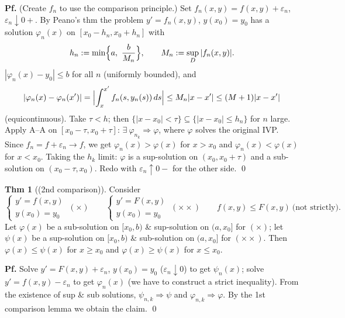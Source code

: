 \documentclass[11pt]{article}
\theoremstyle{definition}
\newtheorem*{theorem}{Thm}
\theoremstyle{remark}
\begin{document}
\textbf{Pf.} (Create $f_n$ to use the comparison principle.) Set
$f_n(x,y) = f(x,y) + \varepsilon_n$, $\varepsilon_n \downarrow 0+$. By Peano's thm the problem
$y' = f_n(x,y)$, $y(x_0) = y_0$ has a solution $\varphi_n(x)$ on $[x_0 - h_n, x_0 + h_n]$ with
\[
h_n := \min\Bigl\{a,\ \frac{b}{M_n}\Bigr\}, \qquad M_n := \sup_D |f_n(x,y)|.
\]
$|\varphi_n(x) - y_0| \le b$ for all $n$ (uniformly bounded), and
\[
|\varphi_n(x) - \varphi_n(x')| = \Bigl|\int_x^{x'} f_n(s, y_n(s))\, ds\Bigr| \le M_n|x - x'| \le (M+1)|x - x'|
\]
(equicontinuous). Take $\tau < h$; then $\{|x - x_0| < \tau\} \subseteq \{|x - x_0| \le h_n\}$ for
$n$ large. Apply A--A on $[x_0 - \tau, x_0 + \tau]$: $\exists\ \varphi_{n_k} \Rightarrow \varphi$,
where $\varphi$ solves the original IVP. Since $f_n = f + \varepsilon_n \to f$, we get
$\varphi_n(x) > \varphi(x)$ for $x > x_0$ and $\varphi_n(x) < \varphi(x)$ for $x < x_0$.
Taking the $h_k$ limit: $\varphi$ is a sup-solution on $(x_0, x_0 + \tau)$ and a sub-solution on
$(x_0 - \tau, x_0)$. Redo with $\varepsilon_n \uparrow 0-$ for the other side. \qed

\begin{theorem}[(2nd comparison)]
Consider
\[
\begin{cases} y' = f(x,y) \\ y(x_0) = y_0 \end{cases}\ (\times)
\qquad \begin{cases} y' = F(x,y) \\ y(x_0) = y_0 \end{cases}\ (\times\times)
\qquad f(x,y) \le F(x,y) \ \text{(not strictly)}.
\]
Let $\varphi(x)$ be a sub-solution on $[x_0, b)$ \& sup-solution on $(a, x_0]$ for $(\times)$; let
$\psi(x)$ be a sup-solution on $[x_0, b)$ \& sub-solution on $(a, x_0]$ for $(\times\times)$. Then
$\varphi(x) \le \psi(x)$ for $x \ge x_0$ and $\varphi(x) \ge \psi(x)$ for $x \le x_0$.
\end{theorem}

\textbf{Pf.} Solve $y' = F(x,y) + \varepsilon_n$, $y(x_0) = y_0$ ($\varepsilon_n \downarrow 0$) to get
$\psi_n(x)$; solve $y' = f(x,y) - \varepsilon_n$ to get $\varphi_n(x)$ (we have to construct a strict
inequality). From the existence of sup \& sub solutions, $\psi_{n,k} \Rightarrow \psi$ and
$\varphi_{n,k} \Rightarrow \varphi$. By the 1st comparison lemma we obtain the claim. \qed
\end{document}
